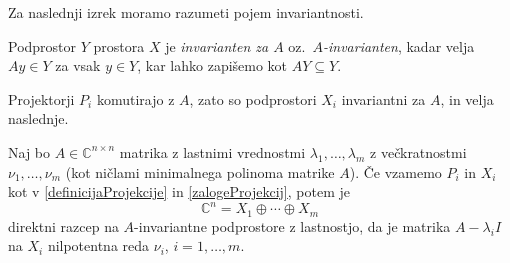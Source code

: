 \documentclass[mat1]{fmfdelo}
\newcommand{\C}{\mathbb C}
\begin{document}
Za naslednji izrek moramo razumeti pojem invariantnosti.
\begin{definicija}
    Podprostor $Y$ prostora $X$ je \emph{invarianten za $A$} oz.\ \emph{$A$-invarianten}, kadar velja $A y \in Y$ za vsak $y \in Y$, kar lahko zapišemo kot $A Y \subseteq Y$.
\end{definicija}
Projektorji $P_i$ komutirajo z $A$, zato so podprostori $X_i$ invariantni za $A$, in velja naslednje. 
\begin{izrek}\label{trditevSpektralniRazcep}
    Naj bo $A \in \C^{n \times n}$ matrika z lastnimi vrednostmi $\lambda_1, \ldots, \lambda_m$ z večkratnostmi $\nu_1, \ldots, \nu_m$ (kot ničlami minimalnega polinoma matrike $A$). Če vzamemo $P_i$ in $X_i$ kot v \eqref{definicijaProjekcije} in \eqref{zalogeProjekcij}, potem je
    \begin{equation}\label{eqSpektralniRazcep}
        \C^n = X_1 \oplus \cdots \oplus X_m
    \end{equation}
    direktni razcep na $A$-invariantne podprostore z lastnostjo, da je matrika $A - \lambda_i I$ na $X_i$ nilpotentna reda $\nu_i$, $i = 1, \ldots, m$.
\end{izrek}
\end{document}
